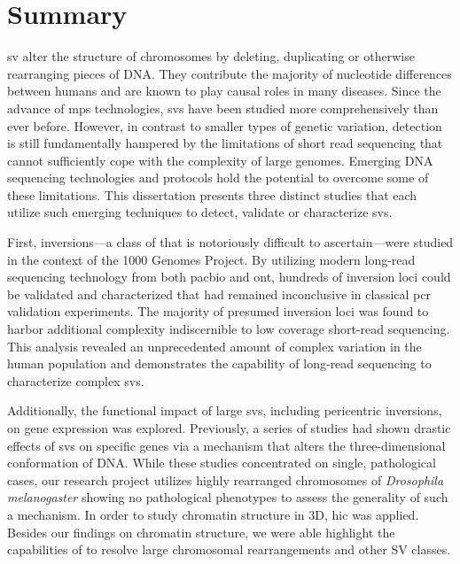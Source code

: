 \cleardoublepage
{}
\chapter*{Summary}

\Acf{sv} alter the structure of chromosomes by deleting, duplicating or
otherwise rearranging pieces of DNA. They contribute the majority of nucleotide
differences between humans and are known to play causal roles in many diseases.
Since the advance of \acf{mps} technologies, \acp{sv} have been
studied more comprehensively than ever before. However, in contrast to smaller
types of genetic variation, \sv detection is still fundamentally hampered by
the limitations of short read sequencing that cannot sufficiently cope with the
complexity of large genomes. Emerging DNA sequencing technologies and protocols
hold the potential to overcome some of these limitations. This dissertation
presents three distinct studies that each utilize such emerging techniques to
detect, validate or characterize \acp{sv}.

First, inversions–--a class of \sv that is notoriously difficult to
ascertain---were studied in the context of the 1000 Genomes Project. By utilizing
modern long-read sequencing technology from both \acl{pacbio} and \acl{ont},
hundreds of inversion loci could be validated and characterized that had remained
inconclusive in classical \acs{pcr} validation experiments. The majority of presumed
inversion loci was found to harbor additional complexity indiscernible to low
coverage short-read sequencing. This analysis revealed an unprecedented amount of
complex variation in the human population and demonstrates the capability of
long-read sequencing to characterize complex \acp{sv}.

Additionally, the functional impact of large \acp{sv}, including
pericentric inversions, on gene expression was explored. Previously, a series of studies had
shown drastic effects of \acp{sv} on specific genes via a mechanism that alters
the three-dimensional conformation of DNA. While these studies concentrated on
single, pathological cases, our research project utilizes highly rearranged
chromosomes of \textit{Drosophila melanogaster} showing no pathological
phenotypes to assess the generality of such a mechanism. In order to study
chromatin structure in 3D, \acf{hic} was applied. Besides our findings on
chromatin structure, we were able highlight the capabilities of \hic to resolve
large chromosomal rearrangements and other SV classes.

